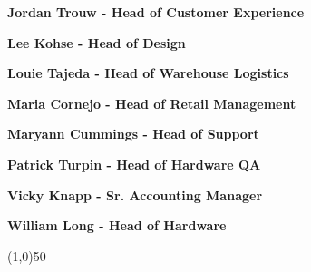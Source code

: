 \documentclass{article}
\begin{document}
\begin {framed}
\begin {center}
\textbf{Jordan Trouw - Head of Customer Experience}
\end {center}
\end {framed}

\begin {framed}
\begin {center}
\textbf{Lee Kohse - Head of Design}
\end {center}
\end {framed}

\begin {framed}
\begin {center}
\textbf{Louie Tajeda - Head of Warehouse Logistics}
\end {center}
\end {framed}


\begin {framed}
\begin {center}
\textbf{Maria Cornejo - Head of Retail Management}
\end {center}
\end {framed}

\begin {framed}
\begin {center}
\textbf{Maryann Cummings - Head of Support}
\end {center}
\end {framed}

\begin {framed}
\begin {center}
\textbf{Patrick Turpin - Head of Hardware QA}
\end {center}
\end {framed}

\begin {framed}
\begin {center}
\textbf{Vicky Knapp - Sr. Accounting Manager}
\end {center}
\end {framed}

\begin {framed}
\begin {center}
\textbf{William Long - Head of Hardware}
\end {center}
\end {framed}

\begin{center}
\line(1,0){50}
\end{center}
\end{document}
